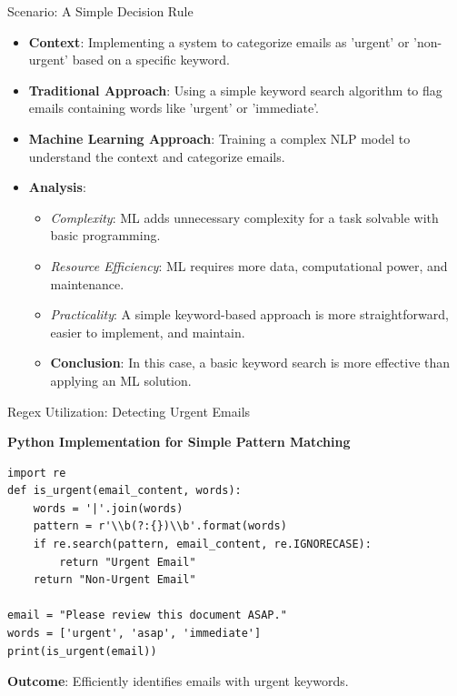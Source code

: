 \documentclass{beamer}
\newenvironment{stepitemize}{\begin{itemize}[<+->]}{\end{itemize} }
\begin{document}
\begin{frame}{Scenario: A Simple Decision Rule}

\begin{stepitemize}
  \item \textbf{Context}: Implementing a system to categorize emails as 'urgent' or 'non-urgent' based on a specific keyword.
  \item \textbf{Traditional Approach}: Using a simple keyword search algorithm to flag emails containing words like 'urgent' or 'immediate'.
  \item \textbf{Machine Learning Approach}: Training a complex NLP model to understand the context and categorize emails.

  \item \textbf{Analysis}:
    \begin{itemize}
      \item \textit{Complexity}: ML adds unnecessary complexity for a task solvable with basic programming.
      \item \textit{Resource Efficiency}: ML requires more data, computational power, and maintenance.
      \item \textit{Practicality}: A simple keyword-based approach is more straightforward, easier to implement, and maintain.

      \item \textbf{Conclusion}: In this case, a basic keyword search is more effective than applying an ML solution.
    \end{itemize}
\end{stepitemize}

\end{frame}

\begin{frame}[fragile]{Regex Utilization: Detecting Urgent Emails}

\textbf{Python Implementation for Simple Pattern Matching}
\begin{tcolorbox}[colback=lightgray, colframe=lightgray,
                  boxsep=0mm, arc=1mm, boxrule=0mm,
                  left=1mm, right=0mm, top=1mm, bottom=1mm]
\begin{verbatim}
import re
def is_urgent(email_content, words):
    words = '|'.join(words)
    pattern = r'\\b(?:{})\\b'.format(words)
    if re.search(pattern, email_content, re.IGNORECASE):
        return "Urgent Email"
    return "Non-Urgent Email"

email = "Please review this document ASAP."
words = ['urgent', 'asap', 'immediate']
print(is_urgent(email))
\end{verbatim}
\end{tcolorbox}
\textbf{Outcome}: Efficiently identifies emails with urgent keywords.

\end{frame}
\end{document}
